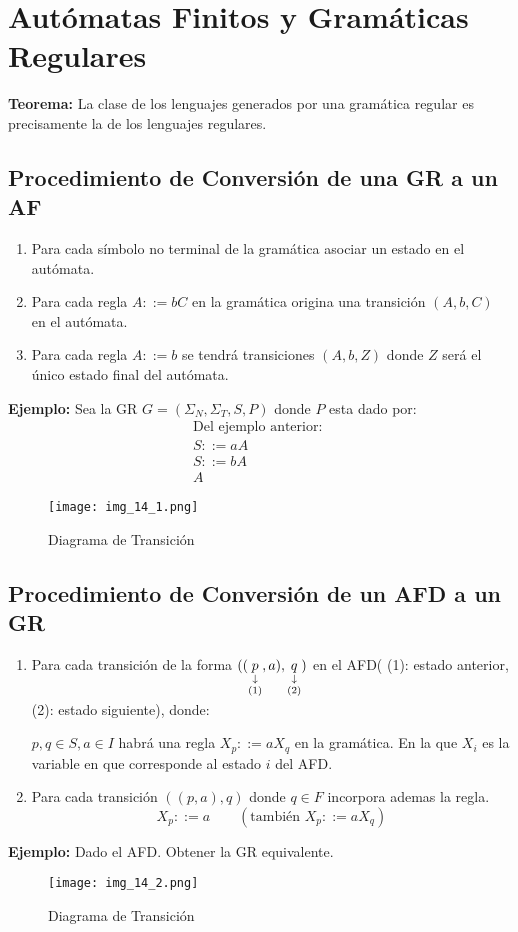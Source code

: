 \chapter{Autómatas Finitos y Gramáticas Regulares}

\textbf{Teorema: }La clase de los lenguajes generados por una gramática regular es precisamente la de los lenguajes regulares.

\section{Procedimiento de Conversión de una GR a un AF}
\begin{enumerate}
\item Para cada símbolo no terminal de la gramática asociar un estado en el autómata.
\item Para cada regla $A::=bC$ en la gramática origina una transición $(A,b,C)$ en el autómata.
\item Para cada regla $A::=b$ se tendrá transiciones $(A,b,Z)$ donde $Z$ será el único estado final del autómata.
\end{enumerate}

\textbf{Ejemplo: }Sea la GR $G=(\Sigma_N,\Sigma_T,S,P)$ donde $P$ esta dado por:
\begin{align*}
\mbox{Del ejemplo anterior: }	\\
S::=aA	\\
S::=bA	\\
A
\end{align*}
\begin{figure}[h!]
\centering
\texttt{[image: img\_14\_1.png]}
\caption{Diagrama de Transición}\label{img_14_1}
\end{figure}

\section{Procedimiento de Conversión de un AFD a un GR}

\begin{enumerate}
\item Para cada transición de la forma $((\downlegend{p}{(1)},a),\downlegend{q}{(2)})$ en el AFD( (1): estado anterior, (2): estado siguiente), donde:

$p,q\in S, a\in I$ habrá una regla $X_p::=aX_q$ en la gramática. En la que $X_i$ es la variable en que corresponde al estado $i$ del AFD.
\item Para cada transición $((p,a),q)$ donde $q\in F$ incorpora ademas la regla.
$$X_p::=a\qquad (\mbox{también }X_p::=aX_q)$$
\end{enumerate}
\textbf{Ejemplo: }Dado el AFD. Obtener la GR equivalente.
\begin{figure}[h!]
\centering
\texttt{[image: img\_14\_2.png]}
\caption{Diagrama de Transición}\label{img_14_2}
\end{figure}


